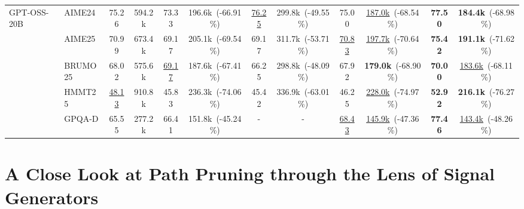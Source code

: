 \documentclass[11pt]{article}
\theoremstyle{plain}
\begin{document}
\begin{table}[ht!]
{\begin{tabular}{llcc cc cc cc cc}
\midrule
\multirow{5}{*}{GPT-OSS-20B}
& AIME24    & \cellcolor{mygreen2}75.26 & 594.2k  & \cellcolor{mygreen1}73.33 & 196.6k~(-66.91\%)  & \cellcolor{mygreen2}\underline{76.25} & 299.8k~(-49.55\%) & \cellcolor{mygreen1}75.00 & \underline{187.0k}~(-68.54\%)    & \cellcolor{mygreen3}\textbf{77.50} & \textbf{184.4k}~(-68.98\%) \\
& AIME25    & \cellcolor{mygreen2}70.99 & 673.4k  & \cellcolor{mygreen1}69.17 & 205.1k~(-69.54\%)  & \cellcolor{mygreen1}69.17 & 311.7k~(-53.71\%) & \cellcolor{mygreen2}\underline{70.83} & \underline{197.7k}~(-70.64\%)    & \cellcolor{mygreen3}\textbf{75.42} & \textbf{191.1k}~(-71.62\%)\\
& BRUMO25   & \cellcolor{mygreen2}68.02 & 575.6k  & \cellcolor{mygreen2}\underline{69.17} & 187.6k~(-67.41\%)  & \cellcolor{mygreen1}66.25 & 298.8k~(-48.09\%) & \cellcolor{mygreen1}67.92 & \textbf{179.0k}~(-68.90\%)       & \cellcolor{mygreen3}\textbf{70.00} & \underline{183.6k}~(-68.11\%) \\
& HMMT25    & \cellcolor{mygreen2}\underline{48.13} & 910.8k & \cellcolor{mygreen1}45.83 & 236.3k~(-74.06\%)  & \cellcolor{mygreen1}45.42 & 336.9k~(-63.01\%) & \cellcolor{mygreen1}46.25 & \underline{228.0k}~(-74.97\%)    & \cellcolor{mygreen3}\textbf{52.92} & \textbf{216.1k}~(-76.27\%)\\
& GPQA-D    & \cellcolor{mygreen1}65.55 & 277.2k  & \cellcolor{mygreen2}66.41 & 151.8k~(-45.24\%)  & - & - & \cellcolor{mygreen2}\underline{68.43} & \underline{145.9k}~(-47.36\%)    & \cellcolor{mygreen3}\textbf{77.46} & \underline{143.4k}~(-48.26\%)\\

\bottomrule
\end{tabular}
}
\vspace{-4mm}
\end{table}


\section{A Close Look at Path Pruning through the Lens of Signal Generators}
\label{sec:Comprehensive}

\end{document}
